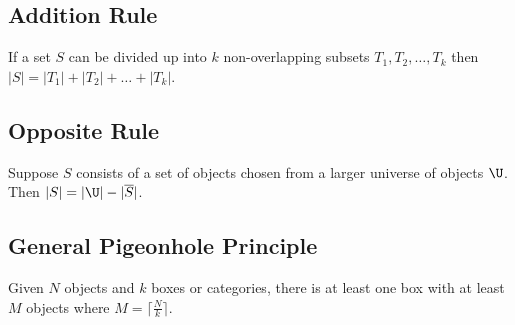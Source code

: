 \documentclass{math}
\begin{document}
\subsection*{Addition Rule}
If a set \( S \) can be divided up into \( k \) non-overlapping subsets
\( T_{1},T_{2},\dots,T_{k} \) then \( |S| = |T_{1}|+|T_{2}|+\dots+|T_{k}| \).

\subsection*{Opposite Rule}
Suppose \( S \) consists of a set of objects chosen from a larger universe of
objects \( \U \). Then \( |S| = |\U|-|\overline{S}| \).

\subsection*{General Pigeonhole Principle}
Given \( N \) objects and \( k \) boxes or categories, there is at least one box
with at least \( M \) objects where \( M = \lceil\frac{N}{k}\rceil \).
\end{document}
